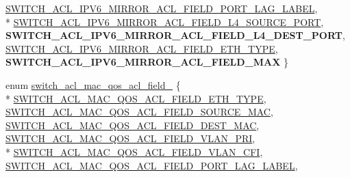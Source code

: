 \begin{DoxyCompactItemize}
\hyperlink{group__ACL_gga96ba930bcd7e5a7141dcf7fb136fd2c8add7e9c1f3c3ed8bff7cc1c7e8cadc428}{S\+W\+I\+T\+C\+H\+\_\+\+A\+C\+L\+\_\+\+I\+P\+V6\+\_\+\+M\+I\+R\+R\+O\+R\+\_\+\+A\+C\+L\+\_\+\+F\+I\+E\+L\+D\+\_\+\+P\+O\+R\+T\+\_\+\+L\+A\+G\+\_\+\+L\+A\+B\+E\+L}, 
\\*
\hyperlink{group__ACL_gga96ba930bcd7e5a7141dcf7fb136fd2c8a3c794d68bee5be5e3022ca16fcbf9fbf}{S\+W\+I\+T\+C\+H\+\_\+\+A\+C\+L\+\_\+\+I\+P\+V6\+\_\+\+M\+I\+R\+R\+O\+R\+\_\+\+A\+C\+L\+\_\+\+F\+I\+E\+L\+D\+\_\+\+L4\+\_\+\+S\+O\+U\+R\+C\+E\+\_\+\+P\+O\+R\+T}, 
{\bfseries S\+W\+I\+T\+C\+H\+\_\+\+A\+C\+L\+\_\+\+I\+P\+V6\+\_\+\+M\+I\+R\+R\+O\+R\+\_\+\+A\+C\+L\+\_\+\+F\+I\+E\+L\+D\+\_\+\+L4\+\_\+\+D\+E\+S\+T\+\_\+\+P\+O\+R\+T}, 
\hyperlink{group__ACL_gga96ba930bcd7e5a7141dcf7fb136fd2c8ab5d10e4565e0ff615c3f5949b535ab8d}{S\+W\+I\+T\+C\+H\+\_\+\+A\+C\+L\+\_\+\+I\+P\+V6\+\_\+\+M\+I\+R\+R\+O\+R\+\_\+\+A\+C\+L\+\_\+\+F\+I\+E\+L\+D\+\_\+\+E\+T\+H\+\_\+\+T\+Y\+P\+E}, 
{\bfseries S\+W\+I\+T\+C\+H\+\_\+\+A\+C\+L\+\_\+\+I\+P\+V6\+\_\+\+M\+I\+R\+R\+O\+R\+\_\+\+A\+C\+L\+\_\+\+F\+I\+E\+L\+D\+\_\+\+M\+A\+X}
 \}
\item 
enum \hyperlink{group__ACL_gaeab9e985d023f151701d8cca10e0f377}{switch\+\_\+acl\+\_\+mac\+\_\+qos\+\_\+acl\+\_\+field\+\_\+} \{ \\*
\hyperlink{group__ACL_ggaeab9e985d023f151701d8cca10e0f377a2e2c1fbe596c607666b7658ba4c0fba4}{S\+W\+I\+T\+C\+H\+\_\+\+A\+C\+L\+\_\+\+M\+A\+C\+\_\+\+Q\+O\+S\+\_\+\+A\+C\+L\+\_\+\+F\+I\+E\+L\+D\+\_\+\+E\+T\+H\+\_\+\+T\+Y\+P\+E}, 
\hyperlink{group__ACL_ggaeab9e985d023f151701d8cca10e0f377a37147ceca07489568497693e4822d566}{S\+W\+I\+T\+C\+H\+\_\+\+A\+C\+L\+\_\+\+M\+A\+C\+\_\+\+Q\+O\+S\+\_\+\+A\+C\+L\+\_\+\+F\+I\+E\+L\+D\+\_\+\+S\+O\+U\+R\+C\+E\+\_\+\+M\+A\+C}, 
\hyperlink{group__ACL_ggaeab9e985d023f151701d8cca10e0f377a0756092ebce816fdffe90f060910fa15}{S\+W\+I\+T\+C\+H\+\_\+\+A\+C\+L\+\_\+\+M\+A\+C\+\_\+\+Q\+O\+S\+\_\+\+A\+C\+L\+\_\+\+F\+I\+E\+L\+D\+\_\+\+D\+E\+S\+T\+\_\+\+M\+A\+C}, 
\hyperlink{group__ACL_ggaeab9e985d023f151701d8cca10e0f377a49486797bb998d2014631786d86cc3ae}{S\+W\+I\+T\+C\+H\+\_\+\+A\+C\+L\+\_\+\+M\+A\+C\+\_\+\+Q\+O\+S\+\_\+\+A\+C\+L\+\_\+\+F\+I\+E\+L\+D\+\_\+\+V\+L\+A\+N\+\_\+\+P\+R\+I}, 
\\*
\hyperlink{group__ACL_ggaeab9e985d023f151701d8cca10e0f377a148e5b1021b84cfb8055724e93f8748c}{S\+W\+I\+T\+C\+H\+\_\+\+A\+C\+L\+\_\+\+M\+A\+C\+\_\+\+Q\+O\+S\+\_\+\+A\+C\+L\+\_\+\+F\+I\+E\+L\+D\+\_\+\+V\+L\+A\+N\+\_\+\+C\+F\+I}, 
\hyperlink{group__ACL_ggaeab9e985d023f151701d8cca10e0f377af08c0448ccfee3cd2b52fc5890be68c8}{S\+W\+I\+T\+C\+H\+\_\+\+A\+C\+L\+\_\+\+M\+A\+C\+\_\+\+Q\+O\+S\+\_\+\+A\+C\+L\+\_\+\+F\+I\+E\+L\+D\+\_\+\+P\+O\+R\+T\+\_\+\+L\+A\+G\+\_\+\+L\+A\+B\+E\+L}, 

\end{DoxyCompactItemize}
